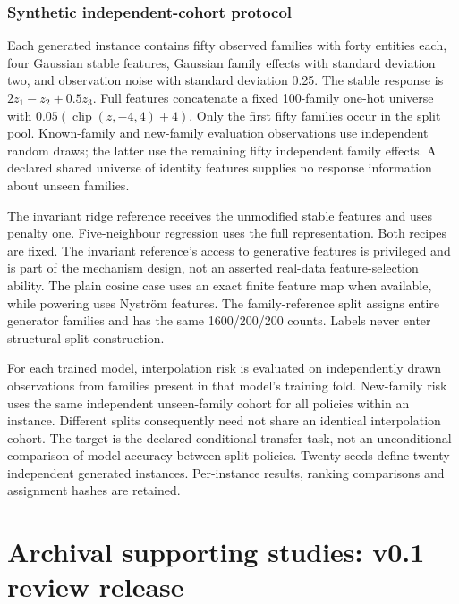\documentclass[12pt]{article}
\begin{document}
\section{Synthetic independent-cohort protocol}

Each generated instance contains fifty observed families with forty entities
each, four Gaussian stable features, Gaussian family effects with standard
deviation two, and observation noise with standard deviation 0.25. The stable
response is $2z_1-z_2+0.5z_3$. Full features concatenate a fixed 100-family
one-hot universe with $0.05(\operatorname{clip}(z,-4,4)+4)$.
Only the first fifty families occur in the split pool. Known-family and
new-family evaluation observations use independent random draws; the latter
use the remaining fifty independent family effects. A declared shared universe
of identity features supplies no response information about unseen families.

The invariant ridge reference receives the unmodified stable features and uses
penalty one. Five-neighbour regression uses the full representation. Both
recipes are fixed. The invariant reference's access to generative features
is privileged and is part of the mechanism design, not an asserted real-data
feature-selection ability. The plain cosine case uses an exact finite feature
map when available, while powering uses Nystr\"om features. The family-reference
split assigns entire generator families and has the same 1600/200/200 counts.
Labels never enter structural split construction.

For each trained model, interpolation risk is evaluated on independently drawn
observations from families present in that model's training fold. New-family
risk uses the same independent unseen-family cohort for all policies within an
instance. Different splits consequently need not share an identical interpolation
cohort. The target is the declared conditional transfer task, not an unconditional
comparison of model accuracy between split policies. Twenty seeds define twenty
independent generated instances. Per-instance results, ranking comparisons and
assignment hashes are retained.



\clearpage


\clearpage


\clearpage
\part*{Archival supporting studies: v0.1 review release}
\end{document}
